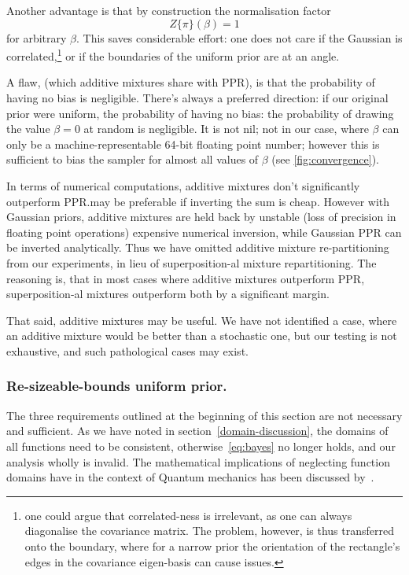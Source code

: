 \documentclass[usenatbib]{mnras}
\begin{document}
Another advantage is that by construction the normalisation factor
\[Z \{ \pi\}(\beta) = 1\] for arbitrary \(\beta\). This saves
considerable effort: one does not care if the Gaussian is
correlated,\footnote{one could argue that correlated-ness is irrelevant,
as one can always diagonalise the covariance matrix. The problem,
however, is thus transferred onto the boundary, where for a narrow
prior the orientation of the rectangle's edges in the covariance
eigen-basis can cause issues.} or if the boundaries of the
uniform prior are at an angle.

A flaw, (which additive mixtures share with PPR), is that the
probability of having no bias is negligible. There's always a
preferred direction: if our original prior were uniform, the
probability of having no bias: the probability of drawing the
value \(\beta=0\) at random is negligible. It is not nil; not in our
case, where \(\beta\) can only be a machine-representable 64-bit
floating point number; however this is sufficient to bias the
sampler for almost all values of \(\beta\) (see
\cref{fig:convergence}).

In terms of numerical computations, additive mixtures don't
significantly outperform PPR.\@It may be preferable if inverting
the sum is cheap. However with Gaussian priors, additive mixtures
are held back by unstable (loss of precision in floating point
operations) expensive numerical inversion, while Gaussian PPR can
be inverted analytically. Thus we have omitted additive mixture
re-partitioning from our experiments, in lieu of superposition-al
mixture repartitioning. The reasoning is, that in most cases where
additive mixtures outperform PPR, superposition-al mixtures
outperform both by a significant margin.

That said, additive mixtures may be useful. We have not identified
a case, where an additive mixture would be better than a
stochastic one, but our testing is not exhaustive, and such
pathological cases may exist.

\subsubsection{Re-sizeable-bounds uniform prior.}\label{sec:orga67f872}

The three requirements outlined at the beginning of this section are
not necessary and sufficient. As we have noted in
section~\vref{domain-discussion}, the domains of all functions need to
be consistent, otherwise~\vref{eq:bayes} no longer holds, and our
analysis wholly is invalid. The mathematical implications of
neglecting function domains have in the context of Quantum mechanics
has been discussed by~\cite{Gieres_2000}.
\end{document}
